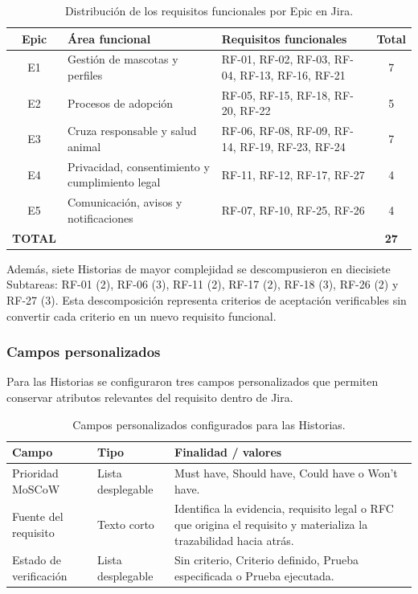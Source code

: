 \documentclass[journal,onecolumn]{IEEEtran}
\begin{document}
	\begin{table}[h]
		\centering
		\small
		\begin{tabular}{|c|p{4.2cm}|p{6cm}|c|}
			\hline
			\textbf{Epic} & \textbf{Área funcional} & \textbf{Requisitos funcionales} & \textbf{Total} \\
			\hline
			E1 & Gestión de mascotas y perfiles & RF-01, RF-02, RF-03, RF-04, RF-13, RF-16, RF-21 & 7 \\
			\hline
			E2 & Procesos de adopción & RF-05, RF-15, RF-18, RF-20, RF-22 & 5 \\
			\hline
			E3 & Cruza responsable y salud animal & RF-06, RF-08, RF-09, RF-14, RF-19, RF-23, RF-24 & 7 \\
			\hline
			E4 & Privacidad, consentimiento y cumplimiento legal & RF-11, RF-12, RF-17, RF-27 & 4 \\
			\hline
			E5 & Comunicación, avisos y notificaciones & RF-07, RF-10, RF-25, RF-26 & 4 \\
			\hline
			\textbf{TOTAL} & & & \textbf{27} \\
			\hline
		\end{tabular}
		\caption{Distribución de los requisitos funcionales por Epic en Jira.}
		\label{tab:epics}
	\end{table}
	
	Además, siete Historias de mayor complejidad se descompusieron en diecisiete Subtareas: RF-01 (2), RF-06 (3), RF-11 (2), RF-17 (2), RF-18 (3), RF-26 (2) y RF-27 (3). Esta descomposición representa criterios de aceptación verificables sin convertir cada criterio en un nuevo requisito funcional.
	
	\subsubsection{Campos personalizados}
	
	Para las Historias se configuraron tres campos personalizados que permiten conservar atributos relevantes del requisito dentro de Jira.
	
	\begin{table}[h]
		\centering
		\small
		\begin{tabular}{|p{3.2cm}|p{3cm}|p{7.5cm}|}
			\hline
			\textbf{Campo} & \textbf{Tipo} & \textbf{Finalidad / valores} \\
			\hline
			Prioridad MoSCoW & Lista desplegable & Must have, Should have, Could have o Won't have. \\
			\hline
			Fuente del requisito & Texto corto & Identifica la evidencia, requisito legal o RFC que origina el requisito y materializa la trazabilidad hacia atrás. \\
			\hline
			Estado de verificación & Lista desplegable & Sin criterio, Criterio definido, Prueba especificada o Prueba ejecutada. \\
			\hline
		\end{tabular}
		\caption{Campos personalizados configurados para las Historias.}
		\label{tab:campos}
	\end{table}
	
\end{document}

